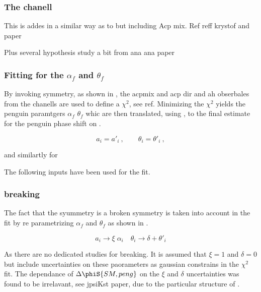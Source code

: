 \subsubsection{The \BsJpsiRho chanell}

This is addes in a similar way as to \BsJpsiKst but including Acp mix.
Ref reff krystof and paper

Plus several hypothesis {\color{red} study a bit from ana ana paper}



\subsubsection{Fitting for the $\alpha_f$ and $\theta_f$}

By invoking \grpsuthree symmetry, as shown in , the acpmix and acp dir and ah obserbales from the chanells \BsJpsiPhi \BsJpsiRho \BsJpsiKst
are used to define a $\chi^2$, see ref. Minimizing the $\chi^2$ yields the penguin paramtgers $\alpha_f$ $\theta_f$ whic are
then translated, using , to the final estimate for the penguin phase shift on \phis.

\begin{equation}
a_i = a'_i\:,\qquad \theta_i = \theta'_i\:,
\label{su3_apply}
\end{equation}

and similartly for \BsJpsiRho

The following inputs have been used for the fit.

\subsubsection{\grpsuthree breaking}
\label{su3_breaking}

The fact that the \grpsuthree syummetry is a broken symmetry is taken into account in the fit by re parametrizing
$\alpha_f$ and $\theta_f$ as shown in .

\begin{equation}
a_i \to \xi \; \alpha_i \quad \theta_i \to \delta + \theta'_i
\label{su3_breaking}
\end{equation}

As there are no dedicated studies for \grpsuthree breaking. It is assumed that $\xi=1$ and $\delta=0$ but include uncertainties
on these paorameters as gaussian constrains in the $\chi^2$ fit. The dependance of $\Delta\phiS{SM,peng}$ on the $\xi$ and $\delta$
uncertainties was found to be irrelavant, {\color{red} see jpsiKst paper}, due to the particular structure of .
